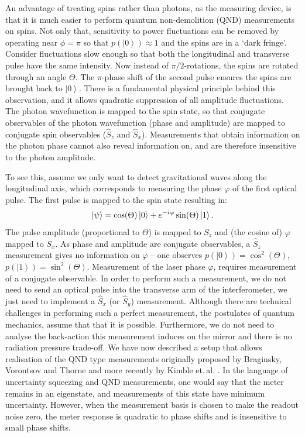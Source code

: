 \documentclass[reqno]{amsart}
\newcommand{\ket}[1]{\left| #1 \right>}
\newcommand{\iu}{{i\mkern1mu}}
\begin{document}
An advantage of treating spins rather than photons, as the measuring device, is that it is much easier to perform quantum non-demolition (QND) measurements on spins. Not only that, sensitivity to power fluctuations can be removed by operating near $\phi = \pi$ so that $p(\ket{0}) \approx 1$ and the spins are in a `dark fringe'. Consider fluctuations slow enough so that both the longitudinal and transverse pulse have the same intensity. Now instead of $\pi/2$-rotations, the spins are rotated through an angle $\Theta$. The $\pi$-phase shift of the second pulse ensures the spins are brought back to $\ket{0}$. There is a fundamental physical principle behind this observation, and it allows quadratic suppression of all amplitude fluctuations. The photon wavefunction is mapped to the spin state, so that conjugate observables of the photon wavefunction (phase and amplitude) are mapped to conjugate spin observables ($\hat{S}_z$ and $\hat{S}_x$). Measurements that obtain information on the photon phase cannot also reveal information on, and are therefore insensitive to the photon amplitude.

To see this, assume we only want to detect gravitational waves along the longitudinal axis, which corresponds to measuring the phase $\varphi$ of the first optical pulse. The first pulse is mapped to the spin state resulting in:
\[\ket{\psi} = \cos(\Theta)\ket{0}+e^{-\iu \varphi}\sin(\Theta)\ket{1}.\]
The pulse amplitude (proportional to $\Theta$) is mapped to $S_z$ and (the cosine of) $\varphi$ mapped to $S_x$. As phase and amplitude are conjugate observables, a $\hat{S}_z$ measurement gives no information on $\varphi$ -- one observes $p(\ket{0}) = \cos^2(\Theta)$, $p(\ket{1}) = \sin^2(\Theta)$. Measurement of the laser phase $\varphi$, requires measurement of a conjugate observable. In order to perform such a measurement, we do not need to send an optical pulse into the transverse arm of the interferometer, we just need to implement a $\hat{S}_x$ (or $\hat{S}_y$) measurement. Although there are technical challenges in performing such a perfect measurement, the postulates of quantum mechanics, assume that that it is possible. Furthermore, we do not need to analyse the back-action this measurement induces on the mirror and there is no radiation pressure trade-off. We have now described a setup that allows realisation of the QND type measurements originally proposed by Braginsky, Vorontsov and Thorne \cite{Braginsky1980} and more recently by Kimble et.\,al. \cite{Kimble2001}. In the language of uncertainty squeezing and QND measurements, one would say that the meter remains in an eigenstate, and measurements of this state have minimum uncertainty. However, when the measurement basis is chosen to make the readout noise zero, the meter response is quadratic to phase shifts and is insensitive to small phase shifts.
\end{document}
